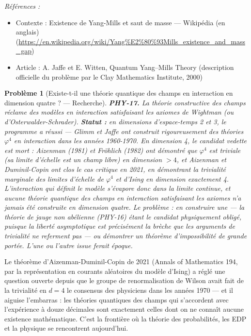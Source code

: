 \documentclass[11pt]{article}
\newtheorem{problem}{Problème}
\newenvironment{refs}{\par\small\noindent\emph{Références :}\begin{itemize}\setlength\itemsep{0pt}}{\end{itemize}\normalsize}
\begin{document}
\begin{refs}
\item Contexte : Existence de Yang-Mills et saut de masse --- Wikipédia (en anglais) (\url{https://en.wikipedia.org/wiki/Yang%E2%80%93Mills_existence_and_mass_gap})
\item Article : A. Jaffe et E. Witten, \og{} Quantum Yang--Mills Theory \fg{} (description officielle du problème par le Clay Mathematics Institute, 2000)
\end{refs}

\bigskip

\begin{problem}[{Existe-t-il une théorie quantique des champs en interaction en dimension quatre ? --- Recherche}]
\textbf{PHY-17.} La théorie constructive des champs réclame des modèles en
interaction satisfaisant les axiomes de Wightman (ou d'Osterwalder-Schrader).
\textbf{Statut :} en dimensions d'espace-temps 2 et 3, le programme a réussi --- Glimm et Jaffe ont
construit rigoureusement des théories $\varphi^4$ en interaction dans les années 1960-1970. En
dimension 4, le candidat vedette est mort : Aizenman (1981) et Fröhlich (1982) ont démontré que
$\varphi^4$ est triviale (sa limite d'échelle est un champ libre) en dimension $> 4$, et
Aizenman et Duminil-Copin ont clos le cas critique en 2021, en démontrant la trivialité marginale
des limites d'échelle de $\varphi^4$ et d'Ising en dimension exactement 4. L'interaction qui
définit le modèle s'évapore donc dans la limite continue, et \textit{aucune} théorie quantique des
champs en interaction satisfaisant les axiomes n'a jamais été construite en dimension quatre. Le
problème : en construire une --- la théorie de jauge non abélienne (PHY-16) étant le candidat
physiquement obligé, puisque la liberté asymptotique est précisément la brèche que les arguments
de trivialité ne referment pas --- ou démontrer un théorème d'impossibilité de grande portée. L'une
ou l'autre issue ferait époque.
\end{problem}

\noindent Le théorème d'Aizenman-Duminil-Copin de 2021 (Annals of Mathematics 194, par
la représentation en courants aléatoires du modèle d'Ising) a réglé une question ouverte depuis
que le groupe de renormalisation de Wilson avait fait de la \og{} trivialité en $d = 4$ \fg{} le
consensus des physiciens dans les années 1970 --- et il aiguise l'embarras : les théories quantiques
des champs qui s'accordent avec l'expérience à douze décimales sont exactement celles dont on ne
connaît aucune existence mathématique. C'est la frontière où la théorie des probabilités, les EDP
et la physique se rencontrent aujourd'hui.
\end{document}
